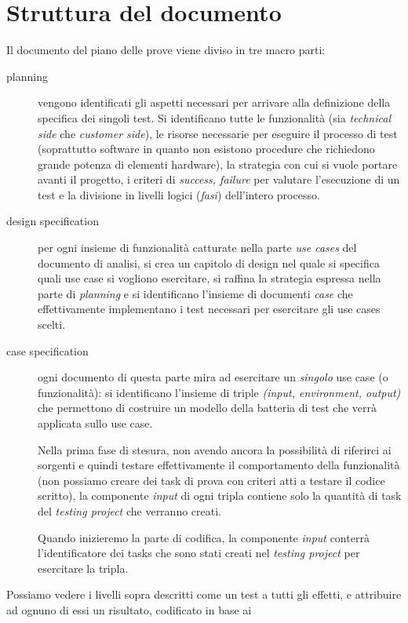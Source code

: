 \section{Struttura del documento}
Il documento del piano delle prove viene diviso in tre macro parti:
\begin{description}
  \item[planning] vengono identificati gli aspetti necessari per
  arrivare alla definizione della specifica dei singoli test. Si identificano
  tutte le funzionalit\`a (sia \emph{technical side} che \emph{customer side}),
  le risorse necessarie per eseguire il processo di test (soprattutto software 
  in quanto non esistono procedure che richiedono grande potenza di elementi 
  hardware), la strategia con cui si vuole portare avanti il progetto, i
  criteri di \emph{success, failure} per valutare l'esecuzione di un test e la
  divisione in livelli logici (\emph{fasi}) dell'intero processo.
  \item[design specification] per ogni insieme di funzionalit\`a catturate
  nella parte \emph{use cases} del documento di analisi, si crea un capitolo di
  design nel quale si specifica quali use case si vogliono esercitare, si
  raffina la strategia espressa nella parte di \emph{planning} e si
  identificano l'insieme di documenti \emph{case} che effettivamente
  implementano i test necessari per esercitare gli use cases scelti.
  \item[case specification] ogni documento di questa parte mira ad esercitare 
  un \emph{singolo} use case (o funzionalit\`a): si identificano l'insieme di
  triple \emph{(input, environment, output)} che permettono di costruire un 
  modello della batteria di test che verr\`a applicata sullo use case.
  
  Nella prima fase di stesura, non avendo ancora la possibilit\`a di
  riferirci ai sorgenti e quindi testare effettivamente il comportamento della
  funzionalit\`a (non possiamo creare dei task di prova con criteri atti a
  testare il codice scritto), la componente \emph{input} di ogni tripla contiene
  solo la quantit\`a di task del \emph{testing project} che verranno creati.
  
  Quando inizieremo la parte di codifica, la componente \emph{input} conterr\`a
  l'identificatore dei tasks che sono stati creati nel \emph{testing project}
  per esercitare la tripla.
\end{description}
Possiamo vedere i livelli sopra descritti come un test a tutti gli effetti, e
attribuire ad ognuno di essi un risultato, codificato in base ai
